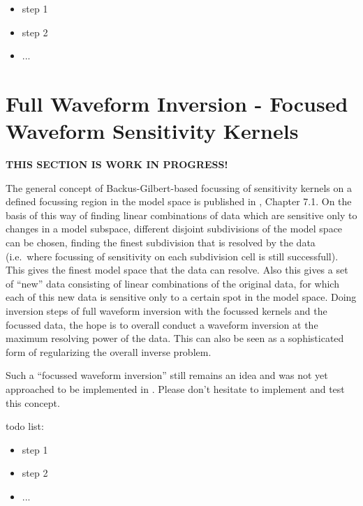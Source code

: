 \begin{itemize}
\item step 1
\item step 2
\item ...
\end{itemize}
%
\newpage
\section*{Full Waveform Inversion - Focused Waveform Sensitivity Kernels} \label{guide,sec:focused_inversion}
{}
%
{\bf THIS SECTION IS WORK IN PROGRESS!}

The general concept of Backus-Gilbert-based focussing of sensitivity kernels on a defined focussing region 
in the model space is published in \cite{_743d334d-dfa4-4a16-8cc5-91cdadc95271}, Chapter 7.1. On the basis
of this way of finding linear combinations of data which are sensitive only to changes in a model subspace, 
different disjoint subdivisions of the model space can be chosen, finding the finest subdivision that
is resolved by the data (i.e.\ where focussing of sensitivity on each subdivision cell is still successfull).
This gives the finest model space that the data can resolve. Also this gives a set of ``new'' data consisting of
linear combinations of the original data, for which each of this new data is sensitive only to a certain
spot in the model space. Doing inversion steps of full waveform inversion with the focussed kernels and the 
focussed data, the hope is to overall conduct a waveform inversion at the maximum resolving power of the data. 
This can also be seen as a sophisticated form of regularizing the overall inverse problem. 

Such a ``focussed waveform inversion'' still remains an idea and was not yet approached to be implemented
in \ASKI{}. Please don't hesitate to implement and test this concept.

todo list:
\begin{itemize}
\item step 1
\item step 2
\item ...
\end{itemize}

